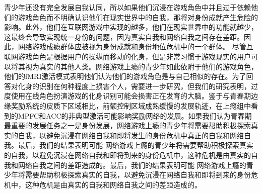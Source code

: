 青少年还没有完全发展自我认同，所以如果他们沉浸在游戏角色中并且过于依赖他们的游戏角色而不明确认识他们在现实世界中的自我，那将对身份成就产生危险的影响。此外，他们在互联网游戏中实现的越多，他们在现实世界中的功能就越少，这最终会导致实现统一身份的问题，因为真实自我和网络自我之间存在差距。因此，网络游戏成瘾群体应被视为身份成就和身份地位危机中的一个群体。%
尽管互联网游戏角色是根据用户的操纵而移动的化身，但是非常习惯于游戏现实的用户可以将其视为真实的其他人类。网络游戏上瘾的青少年如此依附于他们的游戏角色，他们的fMRI激活模式表明他们认为他们的游戏角色是与自己相似的存在。为了回答对化身的识别在何种程度上损害个人，需要进一步研究，但我们的研究表明，过度使用在线角色扮演游戏的化身识别可能会损害正在发育的大脑。鉴于与青春期边缘奖励系统的皮质下区域相比，前额控制区域成熟缓慢的发展轨迹，在上瘾组中看到的MPFC和ACC的非典型激活可能影响奖励网络的发展。如果我们认为青春期最重要的发展任务之一是身份发展，网络游戏上瘾的青少年将需要帮助积极探索真实的自我，以避免沉浸在网络自我和即将发生的身份危机中真正的自我和网络自我。最后，我们的结果表明可能 网络游戏上瘾的青少年将需要帮助积极探索真实的自我，以避免沉浸在网络自我和即将到来的身份危机中，这种危机是由真实的自我和网络自我之间的差距造成的。最后，我们的结果表明可能 网络游戏上瘾的青少年将需要帮助积极探索真实的自我，以避免沉浸在网络自我和即将到来的身份危机中，这种危机是由真实的自我和网络自我之间的差距造成的。%
